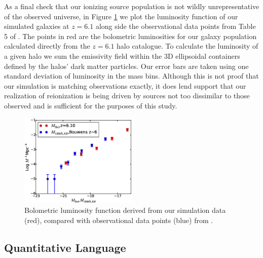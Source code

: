 As a final check that our ionizing source population is not wildly unrepresentative of the observed universe, in Figure \ref{scaledLF} we plot the luminosity function of our simulated galaxies at $z=6.1$ along side the observational data points from Table 5 of \citep{BouwensEtAl2007}. The points in red are the bolometric luminosities for our galaxy population calculated directly from the $z=6.1$ halo catalogue.  To calculate the luminosity of a given halo we sum the emissivity field within the 3D ellipsoidal containers defined by the halos' dark matter particles.  Our error bars are taken using one standard deviation of luminosity in the mass bins.  Although this is not proof that our simulation is matching observations exactly, it does lend support that our realization of reionization is being driven by sources not too dissimilar to those observed and is sufficient for the purposes of this study. 

\begin{figure}
	\includegraphics[width=0.5\textwidth]{scaledLF.eps}
	\caption{Bolometric luminosity function derived from our simulation data (red), compared with observational data points (blue) from \citep{BouwensEtAl2007}.}
	\label{scaledLF}
\end{figure}

\subsection{Quantitative Language}
\label{QuantitativeLanguage}

